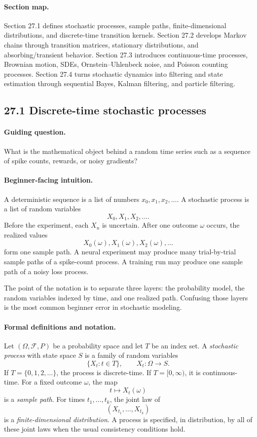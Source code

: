 \paragraph{Section map.}
Section 27.1 defines stochastic processes, sample paths, finite-dimensional distributions, and discrete-time transition kernels. Section 27.2 develops Markov chains through transition matrices, stationary distributions, and absorbing/transient behavior. Section 27.3 introduces continuous-time processes, Brownian motion, SDEs, Ornstein--Uhlenbeck noise, and Poisson counting processes. Section 27.4 turns stochastic dynamics into filtering and state estimation through sequential Bayes, Kalman filtering, and particle filtering.

\subsection{27.1 Discrete-time stochastic processes}

\paragraph{Guiding question.}
What is the mathematical object behind a random time series such as a sequence of spike counts, rewards, or noisy gradients?

\paragraph{Beginner-facing intuition.}
A deterministic sequence is a list of numbers \(x_0,x_1,x_2,\ldots\). A stochastic process is a list of random variables
\[
X_0,X_1,X_2,\ldots.
\]
Before the experiment, each \(X_n\) is uncertain. After one outcome \(\omega\) occurs, the realized values
\[
X_0(\omega),X_1(\omega),X_2(\omega),\ldots
\]
form one sample path. A neural experiment may produce many trial-by-trial sample paths of a spike-count process. A training run may produce one sample path of a noisy loss process.

The point of the notation is to separate three layers: the probability model, the random variables indexed by time, and one realized path. Confusing those layers is the most common beginner error in stochastic modeling.

\paragraph{Formal definitions and notation.}
Let \((\Omega,\mathcal F,P)\) be a probability space and let \(T\) be an index set. A \emph{stochastic process} with state space \(S\) is a family of random variables
\[
\{X_t:t\in T\},\qquad X_t:\Omega\to S.
\]
If \(T=\{0,1,2,\ldots\}\), the process is discrete-time. If \(T=[0,\infty)\), it is continuous-time. For a fixed outcome \(\omega\), the map
\[
t\mapsto X_t(\omega)
\]
is a \emph{sample path}. For times \(t_1,\ldots,t_k\), the joint law of
\[
(X_{t_1},\ldots,X_{t_k})
\]
is a \emph{finite-dimensional distribution}. A process is specified, in distribution, by all of these joint laws when the usual consistency conditions hold.

